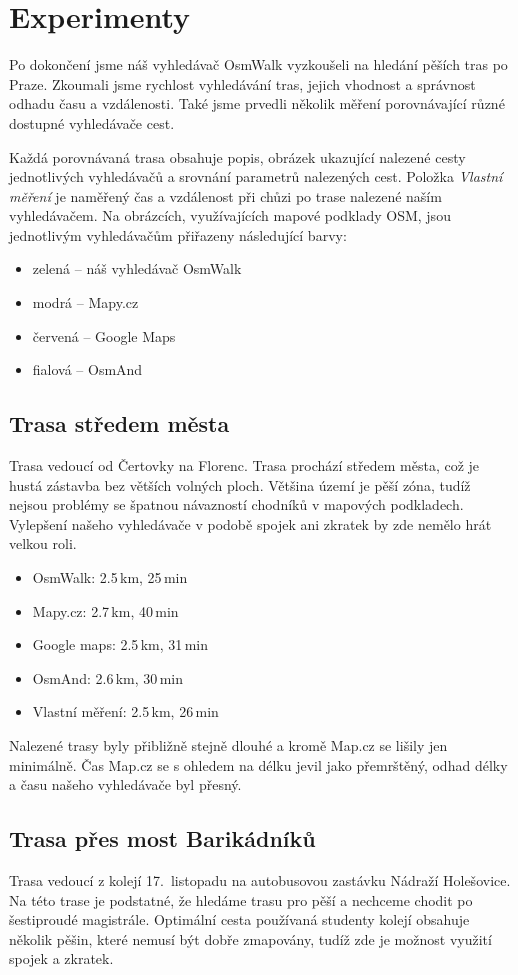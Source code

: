 \chapter{Experimenty}
Po dokončení jsme náš vyhledávač OsmWalk vyzkoušeli na hledání pěších tras po
Praze. Zkoumali jsme rychlost vyhledávání tras, jejich vhodnost a správnost
odhadu času a vzdálenosti. Také jsme prvedli několik měření porovnávající různé
dostupné vyhledávače cest.

Každá porovnávaná trasa obsahuje popis, obrázek ukazující nalezené cesty
jednotlivých vyhledávačů a srovnání parametrů nalezených cest. Položka {\it
Vlastní měření} je naměřený čas a vzdálenost při chůzi po trase nalezené naším
vyhledávačem. Na obrázcích, využívajících mapové podklady OSM, jsou jednotlivým
vyhledávačům přiřazeny následující barvy:
\begin{itemize}
\item zelená -- náš vyhledávač OsmWalk
\item modrá -- Mapy.cz
\item červená -- Google Maps
\item fialová -- OsmAnd
\end{itemize}

\section{Trasa středem města}
Trasa vedoucí od Čertovky na Florenc. Trasa prochází středem města, což je hustá
zástavba bez větších volných ploch. Většina území je pěší zóna, tudíž nejsou
problémy se špatnou návazností chodníků v mapových podkladech. Vylepšení našeho
vyhledávače v podobě spojek ani zkratek by zde nemělo hrát velkou roli.
\begin{itemize}
	\item OsmWalk: 2.5\,km, 25\,min
	\item Mapy.cz: 2.7\,km, 40\,min
	\item Google maps: 2.5\,km, 31\,min
	\item OsmAnd: 2.6\,km, 30\,min
	\item Vlastní měření: 2.5\,km, 26\,min
\end{itemize}
Nalezené trasy byly přibližně stejně dlouhé a kromě Map.cz se lišily jen
minimálně. Čas Map.cz se s ohledem na délku jevil jako přemrštěný, odhad délky a
času našeho vyhledávače byl přesný. 


\section{Trasa přes most Barikádníků}
Trasa vedoucí z kolejí 17.~listopadu na autobusovou zastávku Nádraží Holešovice.
Na této trase je podstatné, že hledáme trasu pro pěší a nechceme chodit po
šestiproudé magistrále. Optimální cesta používaná studenty kolejí obsahuje
několik pěšin, které nemusí být dobře zmapovány, tudíž zde je možnost využití
spojek a zkratek.

